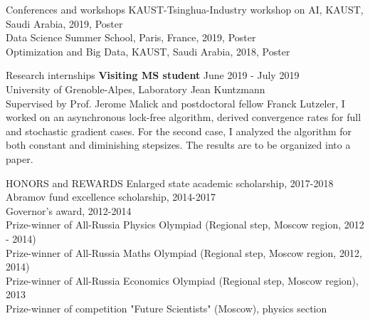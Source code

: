 \documentclass{resume} %
\begin{document}
\begin{rSection}{Conferences and workshops}
{KAUST-Tsinghua-Industry workshop on AI, KAUST, Saudi Arabia, 2019, Poster}\\
{Data Science Summer School, Paris, France, 2019, Poster}\\
{Optimization and Big Data, KAUST, Saudi Arabia, 2018, Poster}\\
\end{rSection}

\begin{rSection}{Research internships}
{\bf Visiting MS student } \hfill June 2019 - July 2019 \\
University of Grenoble-Alpes, Laboratory Jean Kuntzmann\\
Supervised by Prof. Jerome Malick and postdoctoral fellow Franck Lutzeler, I worked on an asynchronous lock-free algorithm, derived convergence rates for full and stochastic gradient cases. For the second case, I analyzed the algorithm for both constant and diminishing stepsizes. The results are to be organized into a paper.
\end{rSection}





\begin{rSection}{HONORS and REWARDS}
{Enlarged state academic scholarship, 2017-2018}\\
{Abramov fund excellence scholarship, 2014-2017}\\
{Governor’s award, 2012-2014}\\
{Prize-winner of All-Russia Physics Olympiad (Regional step, Moscow region, 2012 - 2014)}\\
{Prize-winner of All-Russia Maths Olympiad (Regional step, Moscow region, 2012, 2014)}\\
{Prize-winner of All-Russia Economics Olympiad (Regional step, Moscow region), 2013}\\
{Prize-winner of competition "Future Scientists" (Moscow), physics section}

\end{rSection}
\end{document}
